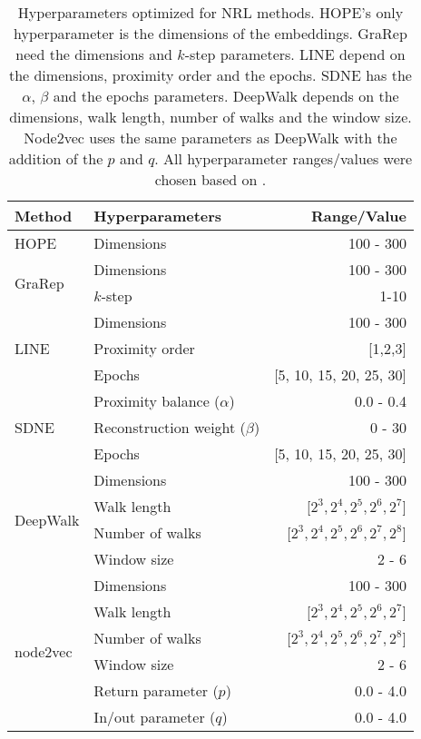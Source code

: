 \begin{table}[ht!]
    \centering
    \begin{tabular}{ |l|l|r| } 
        \hline
        \textbf{Method} & \textbf{Hyperparameters} & \textbf{Range/Value} \\
        \hline
        HOPE & Dimensions & 100 - 300 \\
        \hline
        \multirow{2}{5em}{GraRep} & Dimensions & 100 - 300 \\ 
            & $k$-step & 1-10 \\ 
        \hline
        \multirow{3}{4em}{LINE} & Dimensions & 100 - 300 \\ 
            & Proximity order & [1,2,3] \\
            & Epochs & [5, 10, 15, 20, 25, 30] \\
        \hline
        \multirow{3}{5em}{SDNE} & Proximity balance ($\alpha$) & 0.0 - 0.4 \\ 
            & Reconstruction weight ($\beta$) & 0 - 30 \\
            & Epochs & [5, 10, 15, 20, 25, 30] \\
        \hline
        \multirow{4}{5em}{DeepWalk} & Dimensions & 100 - 300 \\ 
            & Walk length & [$2^3, 2^4, 2^5, 2^6, 2^7$] \\
            & Number of walks & [$2^3, 2^4, 2^5, 2^6, 2^7, 2^8$] \\
            & Window size & 2 - 6 \\
        \hline
        \multirow{6}{5em}{node2vec} & Dimensions & 100 - 300 \\ 
            & Walk length & [$2^3, 2^4, 2^5, 2^6, 2^7$] \\
            & Number of walks & [$2^3, 2^4, 2^5, 2^6, 2^7, 2^8$] \\
            & Window size & 2 - 6 \\
            & Return parameter ($p$) & 0.0 - 4.0 \\
            & In/out parameter ($q$) & 0.0 - 4.0 \\
        \hline
    \end{tabular}
    \caption[Hyperparameters optimized for NRL methods]{Hyperparameters optimized for NRL methods. HOPE's only hyperparameter is the dimensions of the embeddings. GraRep need the dimensions and $k$-step parameters. LINE depend on the dimensions, proximity order and the epochs. SDNE has the $\alpha$, $\beta$ and the epochs parameters. DeepWalk depends on the dimensions, walk length, number of walks and the window size. Node2vec uses the same parameters as DeepWalk with the addition of the $p$ and $q$. All hyperparameter ranges/values were chosen based on \cite{yue_graph_2019}.} 
    \label{tab:hyperparameters}
\end{table}

